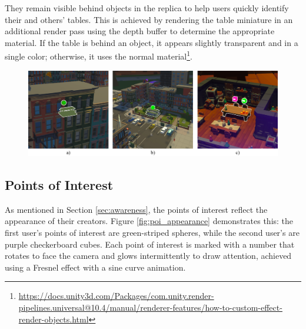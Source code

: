         They remain visible behind objects in the replica to help users quickly identify their and others' tables. This is achieved by rendering the table miniature in an additional render pass using the depth buffer to determine the appropriate material. If the table is behind an object, it appears slightly transparent and in a single color; otherwise, it uses the normal material\footnote{\url{https://docs.unity3d.com/Packages/com.unity.render-pipelines.universal@10.4/manual/renderer-features/how-to-custom-effect-render-objects.html}}.

        \begin{figure}[h!]
            \centering
            \includegraphics[width=1\textwidth]{figures/table_behind.png}
            \label{fig:table_behind}
        \end{figure}


    \subsection{Points of Interest} \label{sec:visual_poi}
        As mentioned in Section \ref{sec:awareness}, the points of interest reflect the appearance of their creators. Figure \ref{fig:poi_appearance} demonstrates this: the first user's points of interest are green-striped spheres, while the second user's are purple checkerboard cubes. Each point of interest is marked with a number that rotates to face the camera and glows intermittently to draw attention, achieved using a Fresnel effect with a sine curve animation.

